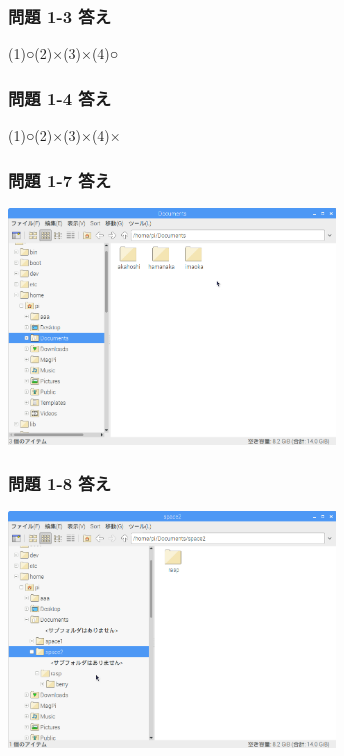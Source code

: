   \subsubsection{\bfseries 問題 1-3 答え}

  (1)○\hspace{2em}(2)×\hspace{2em}(3)×\hspace{2em}(4)○

  \subsubsection{\bfseries 問題 1-4 答え}

  (1)○\hspace{2em}(2)×\hspace{2em}(3)×\hspace{2em}(4)×

\clearpage

\subsubsection{\bfseries 問題 1-7 答え}

\bigskip


\centering
\includegraphics[width=0.65\textwidth]{text01-img/textbook-img212.png}
\flushleft

\bigskip


\bigskip


\bigskip

\subsubsection{\bfseries 問題 1-8 答え}

\bigskip



\centering
\includegraphics[width=0.65\textwidth]{text01-img/textbook-img213.png}
\flushleft

